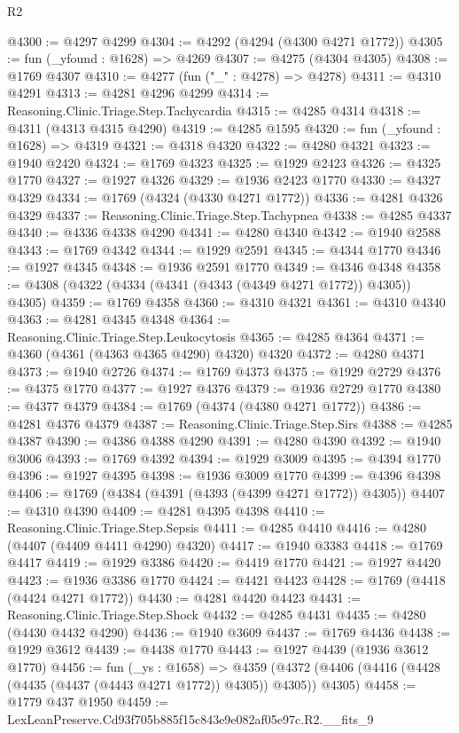 \begin{lexlean}{R2}
\begin{coremodule}
@4300 := @4297 @4299
@4304 := @4292 (@4294 (@4300 @4271 @1772))
@4305 := fun (_yfound : @1628) => @4269
@4307 := @4275 (@4304 @4305)
@4308 := @1769 @4307
@4310 := @4277 (fun ("_" : @4278) => @4278)
@4311 := @4310 @4291
@4313 := @4281 @4296 @4299
@4314 := Reasoning.Clinic.Triage.Step.Tachycardia
@4315 := @4285 @4314
@4318 := @4311 (@4313 @4315 @4290)
@4319 := @4285 @1595
@4320 := fun (_yfound : @1628) => @4319
@4321 := @4318 @4320
@4322 := @4280 @4321
@4323 := @1940 @2420
@4324 := @1769 @4323
@4325 := @1929 @2423
@4326 := @4325 @1770
@4327 := @1927 @4326
@4329 := @1936 @2423 @1770
@4330 := @4327 @4329
@4334 := @1769 (@4324 (@4330 @4271 @1772))
@4336 := @4281 @4326 @4329
@4337 := Reasoning.Clinic.Triage.Step.Tachypnea
@4338 := @4285 @4337
@4340 := @4336 @4338 @4290
@4341 := @4280 @4340
@4342 := @1940 @2588
@4343 := @1769 @4342
@4344 := @1929 @2591
@4345 := @4344 @1770
@4346 := @1927 @4345
@4348 := @1936 @2591 @1770
@4349 := @4346 @4348
@4358 := @4308 (@4322 (@4334 (@4341 (@4343 (@4349 @4271 @1772)) @4305)) @4305)
@4359 := @1769 @4358
@4360 := @4310 @4321
@4361 := @4310 @4340
@4363 := @4281 @4345 @4348
@4364 := Reasoning.Clinic.Triage.Step.Leukocytosis
@4365 := @4285 @4364
@4371 := @4360 (@4361 (@4363 @4365 @4290) @4320) @4320
@4372 := @4280 @4371
@4373 := @1940 @2726
@4374 := @1769 @4373
@4375 := @1929 @2729
@4376 := @4375 @1770
@4377 := @1927 @4376
@4379 := @1936 @2729 @1770
@4380 := @4377 @4379
@4384 := @1769 (@4374 (@4380 @4271 @1772))
@4386 := @4281 @4376 @4379
@4387 := Reasoning.Clinic.Triage.Step.Sirs
@4388 := @4285 @4387
@4390 := @4386 @4388 @4290
@4391 := @4280 @4390
@4392 := @1940 @3006
@4393 := @1769 @4392
@4394 := @1929 @3009
@4395 := @4394 @1770
@4396 := @1927 @4395
@4398 := @1936 @3009 @1770
@4399 := @4396 @4398
@4406 := @1769 (@4384 (@4391 (@4393 (@4399 @4271 @1772)) @4305))
@4407 := @4310 @4390
@4409 := @4281 @4395 @4398
@4410 := Reasoning.Clinic.Triage.Step.Sepsis
@4411 := @4285 @4410
@4416 := @4280 (@4407 (@4409 @4411 @4290) @4320)
@4417 := @1940 @3383
@4418 := @1769 @4417
@4419 := @1929 @3386
@4420 := @4419 @1770
@4421 := @1927 @4420
@4423 := @1936 @3386 @1770
@4424 := @4421 @4423
@4428 := @1769 (@4418 (@4424 @4271 @1772))
@4430 := @4281 @4420 @4423
@4431 := Reasoning.Clinic.Triage.Step.Shock
@4432 := @4285 @4431
@4435 := @4280 (@4430 @4432 @4290)
@4436 := @1940 @3609
@4437 := @1769 @4436
@4438 := @1929 @3612
@4439 := @4438 @1770
@4443 := @1927 @4439 (@1936 @3612 @1770)
@4456 := fun (_ys : @1658) =>
  @4359 (@4372 (@4406 (@4416 (@4428 (@4435 (@4437 (@4443 @4271 @1772)) @4305)) @4305)) @4305)
@4458 := @1779 @437 @1950
@4459 := LexLeanPreserve.Cd93f705b885f15c843e9e082af05e97c.R2.__fits_9

\end{coremodule}
\end{lexlean}
